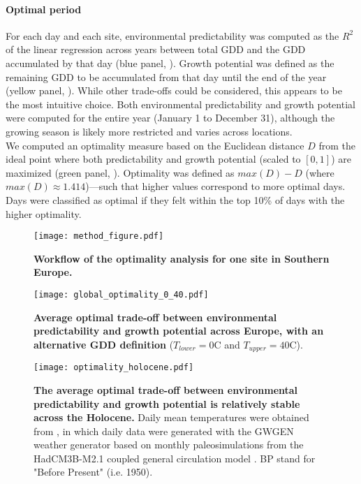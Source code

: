\documentclass[11pt,letter]{article}
\begin{document}
\paragraph{Optimal period} For each day and each site, environmental predictability was computed as the $R^2$ of the linear regression across years between total GDD and the GDD accumulated by that day (blue panel, ). Growth potential was defined as the remaining GDD to be accumulated from that day until the end of the year (yellow panel, ). While other trade-offs could be considered, this appears to be the most intuitive choice. Both environmental predictability and growth potential were computed for the entire year (January 1 to December 31), although the growing season is likely more restricted and varies across locations. \\
We computed an optimality measure based on the Euclidean distance $D$ from  the ideal point where both predictability and growth potential (scaled to $[0,1]$) are maximized (green panel, ). Optimality was defined as $max(D)-D$ (where $max(D)\approx1.414$)---such that higher values correspond to more optimal days. Days were classified as optimal if they felt within the top 10\% of days with the higher optimality.

\begin{figure}[hb]
\hspace*{-1.4cm}
\texttt{[image: method\_figure.pdf]}
\vspace*{-0.4cm}
\caption{\textbf{Workflow of the optimality analysis for one site in Southern Europe.}}
\label{fig:method}
\end{figure}

\begin{figure}[h]
\centering
\texttt{[image: global\_optimality\_0\_40.pdf]}
\vspace*{-0.4cm}
\caption{\textbf{Average optimal trade-off between environmental predictability and growth potential across Europe, with an alternative GDD definition} ($T_{lower}=0$\degree C and $T_{upper}=40$\degree C).}
\label{fig:altgdd}
\end{figure}

\clearpage

\begin{figure}[h]
\hspace*{-1.2cm}
\texttt{[image: optimality\_holocene.pdf]}
\vspace*{-0.7cm}
\caption{\textbf{The average optimal trade-off between environmental predictability and growth potential is relatively stable across the Holocene.} Daily mean temperatures were obtained from \citet{VanderMeersch2024}, in which daily data were generated with the GWGEN weather generator \citep{Sommer2017} based on monthly paleosimulations from the HadCM3B-M2.1 coupled general circulation model \citep{Armstrong2019}. BP stand for "Before Present" (i.e. 1950).}
\label{fig:holocene}
\end{figure}
\end{document}
